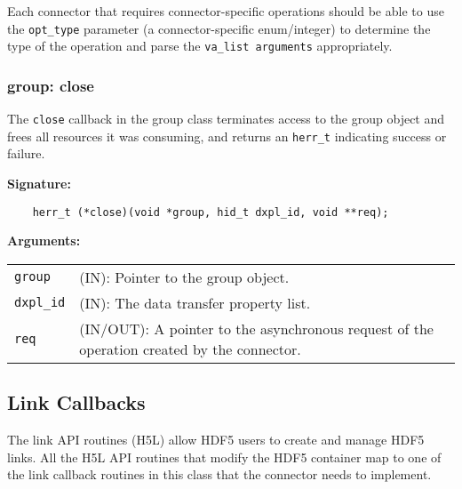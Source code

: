 Each connector that requires connector-specific operations should be able to use the \texttt{opt\_type} parameter (a connector-specific enum/integer) to determine the type of the operation and parse the \texttt{va\_list arguments} appropriately.

\subsubsection{group: close}
The \texttt{close} callback in the group class terminates access to
the group object and frees all resources it was consuming, and returns
an \texttt{herr\_t} indicating success or failure.\bigskip

\begin{mdframed}[style=bgbox]
\textbf{Signature:}
\begin{lstlisting}
    herr_t (*close)(void *group, hid_t dxpl_id, void **req);
\end{lstlisting}

\textbf{Arguments:}\\
\begin{tabular}{l p{13.5cm}}
  \texttt{group} & (IN): Pointer to the group object.\\
  \texttt{dxpl\_id} & (IN): The data transfer property list.\\
  \texttt{req} & (IN/OUT): A pointer to the asynchronous request of the
  operation created by the connector.\\
\end{tabular}
\end{mdframed}


\subsection{Link Callbacks}
The link API routines (H5L) allow HDF5 users to create and manage
HDF5 links. All the H5L API routines that modify the HDF5 container
map to one of the link callback routines in this class that the
connector needs to implement.

